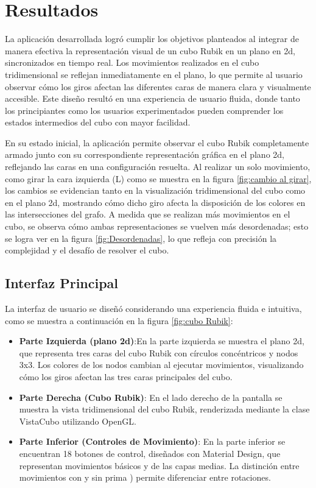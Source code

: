                                                                                                                                                                                                                                                                                                                                                                                                                                                                                                                                                                                                                                                                                                                                                                                                                                                                                                                                                                                                                                                                                                                                                                                                                                                                                                                                                                                                                                                                                                                                                                                                                                                                                                                                                                                                                                                                                                                                                                                                                                                                                                                                                                                                                                                                                                                                                                                                                                                                                                                                                                                                                                                                                                                                                                                                                                                                                                                                                                                                                                                                                                                                                                                                                                                                                                                                                                                                                                                                                                                                                                                                                                                                                                                                                                                                                                                                                                                                                                                                                                                                                                                                                                                                                                                                                                                                                                                                                                                                                                                                                                                                                                                                                                                                                                                                                                                                                                                                                                                                                                                                                                                                                                                                                                                                                                                                                                                                                                                                                                                                                                                                                                                                                                                                                                                                                                                                                                                                                                                                                                                                                                                                                                                                                                                                                                                                                                                                                                                                                                                                                                                                                                                                                                                                                                                                                                                                                                                                                                                                                                                                                                                                                                                                                                                                                                                                                                                                                                                                                                                                                                                                                                                                                                                                                                                                                                                                                                                                                                                                                                                                                                                                                                                                                                                                                                                                                                                                                                                                                                                                                                                                                                                                                                                                                                                                                                                                                                                                                                                                                                                                                                                                                                                                                                                                                                                                                                                                                                                                                                                                                                                                                                                                                                                                                                                                                                                                                                                                                                                                                                                                                                                                                                                                                                                                                                                                                                                                                                                                                                                                                                                                                                                                                                                                                                                                                                                                                                                                                                                                                                                                                                                                                                                                                                                                                                                                                                                                                                                                                                                                                                                                                                                                                                                                                                                                                                                                                                                                                                                                                                                                                                                                                                                                                                                                                                                                                                                                                                                                                                                                                                                                                                                                                                                                                                                                                                                                                                                                                                                                                                                                                                                                                                                                                                                                                                                                                                                                                                                                                                                                                                                                                                                                                                                                                                                                                                                                                                                                                                                                                                                                                                                                                                                                                                                                                                                                                                                                                                                                                                                                                                                                                                                                                                                                                                                                                                                                                                                                                                                                                                                                                                                                                                                                                                                                                                                                                                                                                                                                                                                                                                                                                                                                                                                                                                                                                                                                                                                                                                                                                                                                                                                                                                                                                                                                                                                                                                                                                                                                                                                                                                                                                                                                                                                                                                                                                                                                                                                                                                                                                                                                                                                                                                                                                                                                                                                                                                                                                                                                                                                                                                                                                                                                                                                                                                                                                                                                                                                                                                                                                                                                                                                                                                                                                                                                                                                                                                                                                                                                                                                                                                                                                                                                                                                                                                                                                                                                                                                                                                                                                                                                                                                                                                                                                                                                                                                                                                                                                                                                                                                                                                                                                                                                                                                                                                                                                                                                                                                                                                                                                                                                                                                                                                                                                                                                                                                                                                                                                                                                                                                                                                                                                                                                                                                                                                                                                                                                                                                                                                                                                                                                                                                                                                                                                                                                                                                                                                                                                                                                                                                                                                                                                                                                                                                                                                                                                                                                                                                                                                                                                                                                                                                                                                                                                                                                                                                                                                                                                                                                                                                                                                                                                                                                                                                                                                                                                                                                                                                                                                                                                                                                                                                                                                                                                                                                                                                                                                                                                                                                                                                                                                                                                                                                                                                                                                                                                                                                                                                                                                                                                                                                                                                                                                                                                                                                                                                                                                                                                                                                                                                                                                                                                                                                                                                                                                                                                                                                                                                                                                                                                                                                                                                                                                                                                                                                                                                                                                                                                                                                                                                                                                                                                                                                                                                                                                                                                                                                                                                                                                                                                                                                                                                                                                                                                                                                                                                                                                                                                                                                                                                                                                                                                                                                                                                                                                                                                                                                                                                                                                                                                                                                                                                                                                                                                                                                                                                                                                                                                                                                                                                                                                                                                                                                                                                                                                                                                                                                                                                                                                                                                                                                                                                                                                                                                                                                                                                                                                                                                                                                                                                                                                                                                                                                                                                                                                                                                                                                                                                                                                                                                                                                                                                                                                                                                                                                                                                                                                                                                                                                                                                                                                                                                                                                                                                                                                                                                                                                                                                                                                                                                                                                                                                                                                                                                                                                                                                                                                                                                                                                                                                                                                                                                                                                                                                                                                                                                                                                                                                                                                                                                                                                                                                                                                                                                                                                                                                                                                                                                                                                                                                                                                                                                                                                                                                                                                                                                                                                                                                                                                                                                                                                                                                                                                                                                                                                                                                                                                                                                                                                                                                                                                                                                                                                                                                                                                                                                                                                                                                                                                                                                                                                                                                                                                                                                                                                                                                                                                                                                                                                                                                                                                                                                                                                                                                                                                                                                                                                                                                                                                                                                                                                                                                                                                                                                                                                                                                                                                                                                                                                                                                                                                                                                                                                                                                                                                                                                                                                                                                                                                                                                                                                                                                                                                                                                                                                                                                                                                                                                                                                                                                                                                                                                                                                                                                                                                                                                                                                                                                                                                                                                                                                                                                                                                                                                                                                                                                                                                                                                                                                                                                                                                                                                                                                                                                                                                                                                                                                                                                                                                                                                                                                                                                                                                                                                                                                                                                                                                                                                                                                                                                                                                                                                                                                                                                                                                                                                                                                                                                                                                                                                                                                                                                                                                                                                                                                                                                                                                                                                                                                                                                                                                                                                                                                                                                                                                                                                                                                                                                                                                                                                                                                                                                                                                                                                                                                                                                                                                                                                                                                                                                                                                                                                                                                                                                                                                                                                                                                                                                                                                                                                                                                                                                                                                                                                                                                                                                                                                                                                                                                                                                                                                                                                                                                                                                                                                                                                                                                                                                                                                                                                                                                                                                                                                                                                                                                                                                                                                                                                                                                                                                                                                                                                                                                                                                                                                                                                                                                                                                                                                                                                                                                                                                                                                                                                                                                                                                                                                                                                                                                                                                                                                                                                                                                                                                                                                                                                                                                                                                                                                                                                                                                                                                                                                                                                                                                                                                                                                                                                                                                                                                                                                                                                                                                                                                                                                                                                                                                                                                                                                                                                                                                                                                                                                                                                                                                                                                                                                                                                                                                                                                                                                                                                                                                                                                                                                                                                                                                                                                                                                                                                                                                                                                                                                                                                                                                                                                                                                                                                                                                                                                                                                                                                                                                                                                                                                                                                                                                                                                                                                                                                                                                                                                                                                                                                                                                                                                                                                                                                                                                                                                                                                                                                                                                                                                                                                                                                                                                                                                                                                                \documentclass[conference]{IEEEtran}
\begin{document}
\section{Resultados}
La aplicación desarrollada logró cumplir los objetivos planteados al integrar de manera efectiva la representación visual de un cubo Rubik en un plano en 2d, sincronizados en tiempo real. Los movimientos realizados en el cubo tridimensional se reflejan inmediatamente en el plano, lo que permite al usuario observar cómo los giros afectan las diferentes caras de manera clara y visualmente accesible. Este diseño resultó en una experiencia de usuario fluida, donde tanto los principiantes como los usuarios experimentados pueden comprender los estados intermedios del cubo con mayor facilidad.

En su estado inicial, la aplicación permite observar el cubo Rubik completamente armado junto con su correspondiente representación gráfica en el plano 2d, reflejando las caras en una configuración resuelta. Al realizar un solo movimiento, como girar la cara izquierda (L) como se muestra en la figura \ref{fig:cambio al girar}, los cambios se evidencian tanto en la visualización tridimensional del cubo como en el plano 2d, mostrando cómo dicho giro afecta la disposición de los colores en las intersecciones del grafo. A medida que se realizan más movimientos en el cubo, se observa cómo ambas representaciones se vuelven más desordenadas; esto se logra ver en la figura \ref{fig:Desordenadas}, lo que refleja con precisión la complejidad y el desafío de resolver el cubo.

\subsection{Interfaz Principal}
La interfaz de usuario se diseñó considerando una experiencia fluida e intuitiva, como se muestra a continuación en la figura \ref{fig:cubo Rubik}:

\begin{itemize}
    \item \textbf{Parte Izquierda (plano 2d)}:En la parte izquierda se muestra el plano 2d, que representa tres caras del cubo Rubik con círculos concéntricos y nodos 3x3. Los colores de los nodos cambian al ejecutar movimientos, visualizando cómo los giros afectan las tres caras principales del cubo.
    \item \textbf{Parte Derecha (Cubo Rubik)}: En el lado derecho de la pantalla se muestra la vista tridimensional del cubo Rubik, renderizada mediante la clase VistaCubo utilizando OpenGL.
    \item \textbf{Parte Inferior (Controles de Movimiento)}: En la parte inferior se encuentran 18 botones de control, diseñados con Material Design, que representan movimientos básicos y de las capas medias. La distinción entre movimientos con y sin prima ) permite diferenciar entre rotaciones.
\end{itemize} 
\end{document}
